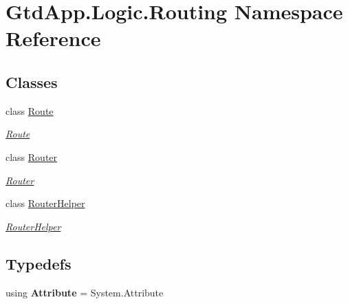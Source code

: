 \hypertarget{namespace_gtd_app_1_1_logic_1_1_routing}{}\section{Gtd\+App.\+Logic.\+Routing Namespace Reference}
\label{namespace_gtd_app_1_1_logic_1_1_routing}
\subsection*{Classes}
\begin{DoxyCompactItemize}
\item 
class \mbox{\hyperlink{class_gtd_app_1_1_logic_1_1_routing_1_1_route}{Route}}
\begin{DoxyCompactList}\small\item\em \mbox{\hyperlink{class_gtd_app_1_1_logic_1_1_routing_1_1_route}{Route}} \end{DoxyCompactList}\item 
class \mbox{\hyperlink{class_gtd_app_1_1_logic_1_1_routing_1_1_router}{Router}}
\begin{DoxyCompactList}\small\item\em \mbox{\hyperlink{class_gtd_app_1_1_logic_1_1_routing_1_1_router}{Router}} \end{DoxyCompactList}\item 
class \mbox{\hyperlink{class_gtd_app_1_1_logic_1_1_routing_1_1_router_helper}{Router\+Helper}}
\begin{DoxyCompactList}\small\item\em \mbox{\hyperlink{class_gtd_app_1_1_logic_1_1_routing_1_1_router_helper}{Router\+Helper}} \end{DoxyCompactList}\end{DoxyCompactItemize}
\subsection*{Typedefs}
\begin{DoxyCompactItemize}
\item 
\mbox{\label{namespace_gtd_app_1_1_logic_1_1_routing_adec2b8aa0ce478e2a1477e414c6b6350}} 
using {\bfseries Attribute} = System.\+Attribute
\end{DoxyCompactItemize}
